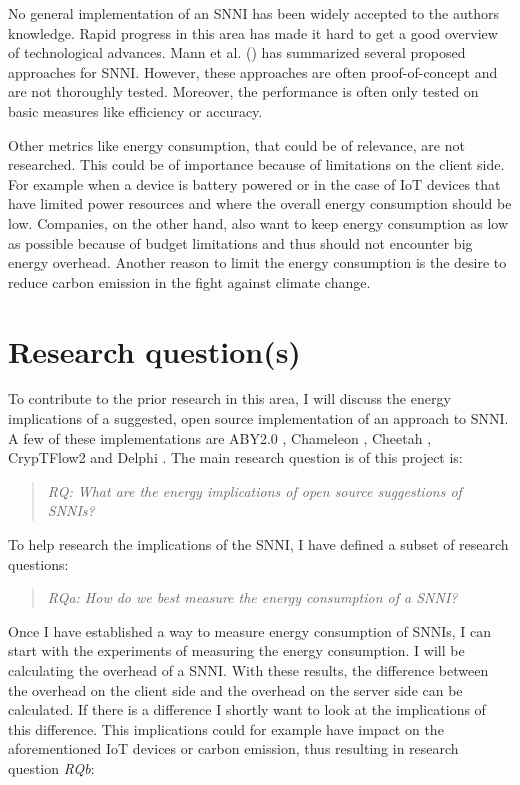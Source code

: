 \documentclass[../thesis.tex]{subfiles}
\begin{document}
No general implementation of an SNNI has been widely accepted to the authors knowledge. Rapid progress in this area has made it hard to get a good overview of technological advances. Mann et al. (\citeyear{Mann22}) has summarized several proposed approaches for SNNI. However, these approaches are often proof-of-concept and are not thoroughly tested. Moreover, the performance is often only tested on basic measures like efficiency or accuracy.

Other metrics like energy consumption, that could be of relevance, are not researched. This could be of importance because of limitations on the client side. For example when a device is battery powered or in the case of IoT devices that have limited power resources and where the overall energy consumption should be low. Companies, on the other hand, also want to keep energy consumption as low as possible because of budget limitations and thus should not encounter big energy overhead. Another reason to limit the energy consumption is the desire to reduce carbon emission in the fight against climate change.

\section{Research question(s)}
To contribute to the prior research in this area, I will discuss the energy implications of a suggested, open source implementation of an approach to SNNI. A few of these implementations are ABY2.0 \parencite{ABY20}, Chameleon \parencite{Chameleon}, Cheetah \parencite{Cheetah}, CrypTFlow2 \parencite{CrypTFlow2} and Delphi \parencite{Delphi}. The main research question is of this project is:

\begin{quote} \emph{RQ: What are the energy implications of open source suggestions of SNNIs?} \end{quote} 

\noindent To help research the implications of the SNNI, I have defined a subset of research questions:

\begin{quote} \emph{RQa: How do we best measure the energy consumption of a SNNI?} \end{quote}

\noindent Once I have established a way to measure energy consumption of SNNIs, I can start with the experiments of measuring the energy consumption. I will be calculating the overhead of a SNNI. With these results, the difference between the overhead on the client side and the overhead on the server side can be calculated. If there is a difference I shortly want to look at the implications of this difference. This implications could for example have impact on the aforementioned IoT devices or carbon emission, thus resulting in research question \textit{RQb}:
\end{document}
